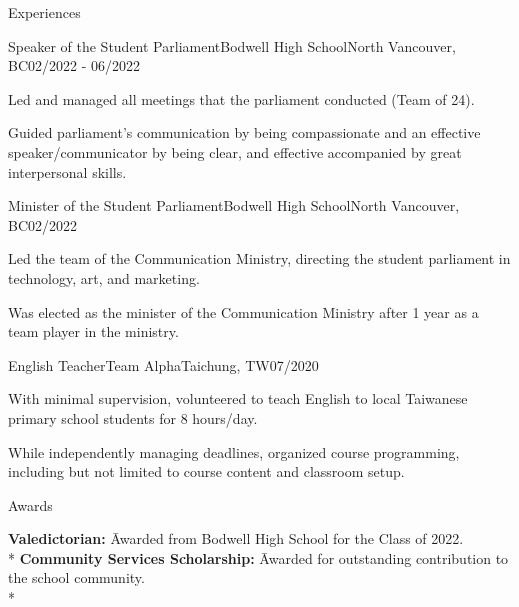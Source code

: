 \documentclass{article}
\newlength{\tabin}
\newlength{\secsep}
\newcommand{\lineunder}{\vspace*{-8pt} \\ \hspace*{-6pt} \hrulefill \\ \vspace*{-15pt}}
\newenvironment{tabbedsection}[1]{
  \begin{list}{}{
      \setlength{\itemsep}{0pt}
      \setlength{\labelsep}{0pt}
      \setlength{\labelwidth}{0pt}
      \setlength{\leftmargin}{\tabin}
      \setlength{\rightmargin}{\tabin}
      \setlength{\listparindent}{0pt}
      \setlength{\parsep}{0pt}
      \setlength{\parskip}{0pt}
      \setlength{\partopsep}{0pt}
      \setlength{\topsep}{#1}
    }
  \item[]
}{\end{list}}
\newenvironment{nospacetabbing}{
    \begin{tabbing}
}{\end{tabbing}\vspace{-1.2em}}
\newenvironment{resume_section}[1]{
  \filbreak
  \vspace{2\secsep}
  \textsc{\large#1}
  \lineunder
  \begin{tabbedsection}{\secsep}
}{\end{tabbedsection}}
\newenvironment{subitems}{
  \renewcommand{\labelitemi}{-}
  \begin{itemize}
      \setlength{\labelsep}{1em}
}{\end{itemize}}
\newenvironment{resume_employer}[4]{
  \vspace{\secsep}
  \textbf{#1} {\footnotesize #3} \hfill {\footnotesize#4} \hspace{-1em} \\
  \small{#2}  
  \vspace{\secsep}
  \begin{tabbedsection}{0pt}
  \begin{subitems}
}{\end{subitems}\end{tabbedsection}}
\begin{document}
\begin{resume_section}{Experiences}
  \begin{resume_employer}{Speaker of the Student Parliament}{Bodwell High School}{North Vancouver, BC}{02/2022 - 06/2022}
    \item Led and managed all meetings that the parliament conducted (Team of 24).
    \item Guided parliament's communication by being compassionate and an effective speaker/communicator by being clear, and effective accompanied by great interpersonal skills.
  \end{resume_employer}

  \begin{resume_employer}{Minister of the Student Parliament}{Bodwell High School}{North Vancouver, BC}{02/2022}
    \item Led the team of the Communication Ministry, directing the student parliament in technology, art, and marketing.
    \item Was elected as the minister of the Communication Ministry after 1 year as a team player in the ministry.
  \end{resume_employer}

  \begin{resume_employer}{English Teacher}{Team Alpha}{Taichung, TW}{07/2020}
    \item With minimal supervision, volunteered to teach English to local Taiwanese primary school students for 8 hours/day.
    \item While independently managing deadlines, organized course programming, including but not limited to course content and classroom setup.
  \end{resume_employer}

\end{resume_section}
  
\begin{resume_section}{Awards}
  \begin{nospacetabbing}
    \textbf{Valedictorian:} \= Awarded from Bodwell High School for the Class of 2022.\\*
    \textbf{Community Services Scholarship:} \= Awarded for outstanding contribution to the school community.\\*
  \end{nospacetabbing}
\end{resume_section}
\end{document}
